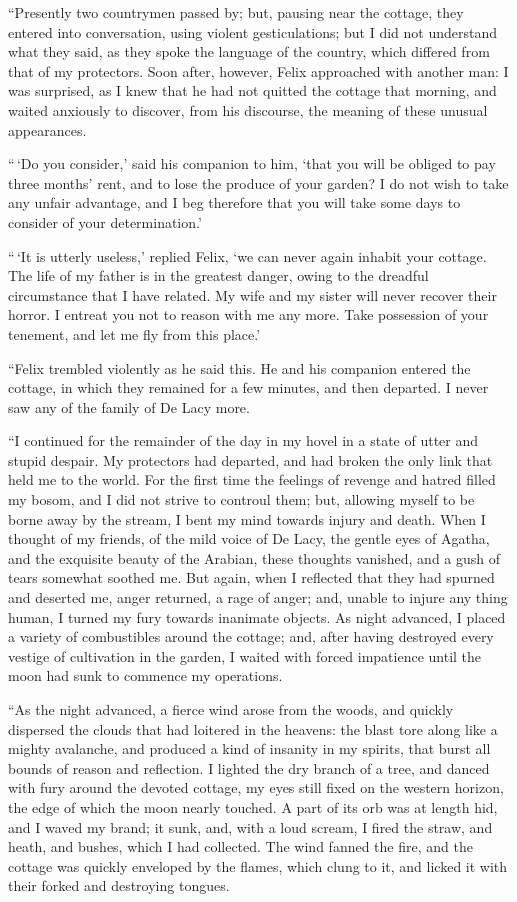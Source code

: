 ``Presently two countrymen passed
by; but, pausing near the cottage, they
entered into conversation, using violent
gesticulations; but I did not understand
what they said, as they spoke the
language of the country, which differed
from that of my protectors. Soon after,
however, Felix approached with another
man: I was surprised, as I knew
that he had not quitted the cottage
that morning, and waited anxiously to
discover, from his discourse, the meaning
of these unusual appearances.

``\,`Do you consider,' said his companion
to him, `that you will be
obliged to pay three months' rent, and
to lose the produce of your garden?
I do not wish to take any unfair advantage,
and I beg therefore that you will
take some days to consider of your
determination.'

``\,`It is utterly useless,' replied
Felix, `we can never again inhabit
your cottage. The life of my father is
in the greatest danger, owing to the
dreadful circumstance that I have related.
My wife and my sister will
never recover their horror. I entreat
you not to reason with me any more.
Take possession of your tenement, and
let me fly from this place.'

``Felix trembled violently as he said
this. He and his companion entered
the cottage, in which they remained for
a few minutes, and then departed. I
never saw any of the family of De
Lacy more.

``I continued for the remainder of
the day in my hovel in a state of utter
and stupid despair. My protectors
had departed, and had broken the only
link that held me to the world. For
the first time the feelings of revenge and
hatred filled my bosom, and I did not
strive to controul them; but, allowing
myself to be borne away by the stream,
I bent my mind towards injury and
death. When I thought of my friends,
of the mild voice of De Lacy, the
gentle eyes of Agatha, and the exquisite
beauty of the Arabian, these
thoughts vanished, and a gush of tears
somewhat soothed me. But again,
when I reflected that they had spurned
and deserted me, anger returned, a rage
of anger; and, unable to injure any
thing human, I turned my fury towards
inanimate objects. As night advanced,
I placed a variety of combustibles
around the cottage; and, after having
destroyed every vestige of cultivation
in the garden, I waited with forced
impatience until the moon had sunk to
commence my operations.

``As the night advanced, a fierce
wind arose from the woods, and quickly
dispersed the clouds that had loitered
in the heavens: the blast tore along
like a mighty avalanche, and produced
a kind of insanity in my spirits, that
burst all bounds of reason and reflection.
I lighted the dry branch of a
tree, and danced with fury around the
devoted cottage, my eyes still fixed on
the western horizon, the edge of which
the moon nearly touched. A part of
its orb was at length hid, and I waved
my brand; it sunk, and, with a loud
scream, I fired the straw, and heath,
and bushes, which I had collected. The
wind fanned the fire, and the cottage was
quickly enveloped by the flames, which
clung to it, and licked it with their
forked and destroying tongues.


